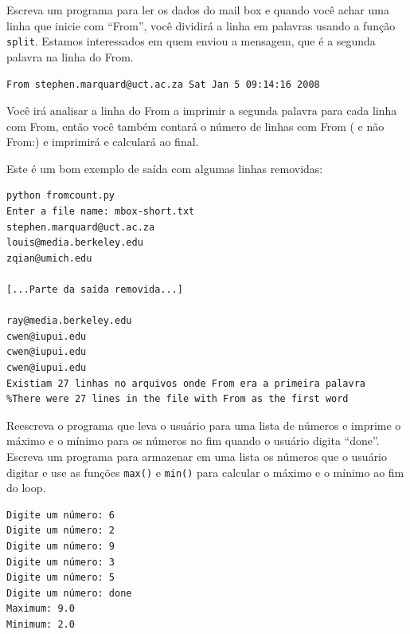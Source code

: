 \begin{ex}
Escreva um programa para ler os dados do mail box e quando você achar
uma linha que inicie com ``From'', você dividirá a linha em palavras 
usando a função {\tt split}. Estamos interessados em quem enviou a mensagem,
que é a segunda palavra na linha do From.

{\tt From stephen.marquard@uct.ac.za Sat Jan  5 09:14:16 2008 }

Você irá analisar a linha do From a imprimir a segunda palavra
para cada linha com From, então você também contará o número de 
linhas com From ( e não From:) e imprimirá e calculará ao final.

Este é um bom exemplo de saída com algumas linhas removidas:


\beforeverb
\begin{verbatim}
python fromcount.py 
Enter a file name: mbox-short.txt
stephen.marquard@uct.ac.za
louis@media.berkeley.edu
zqian@umich.edu

[...Parte da saída removida...]

ray@media.berkeley.edu
cwen@iupui.edu
cwen@iupui.edu
cwen@iupui.edu
Existiam 27 linhas no arquivos onde From era a primeira palavra
%There were 27 lines in the file with From as the first word
\end{verbatim}
\afterverb
%
\end{ex}

\begin{ex}
Reescreva o programa que leva o usuário para uma lista de 
números e imprime o máximo e o mínimo para os números no fim 
quando o usuário digita ``done''. Escreva um programa para armazenar
em uma lista os números que o usuário digitar e use as funções
{\tt max()} e {\tt min()} para calcular o máximo e o mínimo ao fim
do loop.



\beforeverb
\begin{verbatim}
Digite um número: 6
Digite um número: 2
Digite um número: 9
Digite um número: 3
Digite um número: 5
Digite um número: done
Maximum: 9.0
Minimum: 2.0
\end{verbatim}
\afterverb
%

\end{ex}

